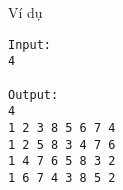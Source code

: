 Ví dụ
\begin{verbatim}
Input:
4

Output:
4
1 2 3 8 5 6 7 4
1 2 5 8 3 4 7 6
1 4 7 6 5 8 3 2
1 6 7 4 3 8 5 2

\end{verbatim}